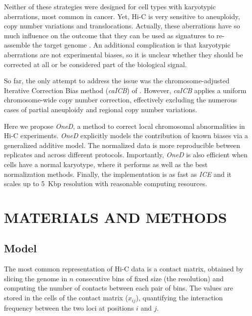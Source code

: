 \documentclass[a4,center,fleqn]{NAR}
\begin{document}
Neither of these strategies were designed for cell types with karyotypic
aberrations, most common in cancer. Yet, Hi-C is very sensitive to
aneuploidy, copy number variations and translocations. Actually, these
aberrations have so much influence on the outcome that they can be used as
signatures to re-assemble the target genome \citep{korbel2013genome}. An
additional complication is that karyotypic aberrations are not
experimental biases, so it is unclear whether they should be corrected at
all or be considered part of the biological signal.

\enlargethispage{-65.1pt}

So far, the only attempt to address the issue was the chromosome-adjusted
Iterative Correction Bias method (\textit{caICB}) of
\cite{wu2016computational}. However, \textit{caICB} applies a uniform
chromosome-wide copy number correction, effectively excluding the numerous
cases of partial aneuploidy and regional copy number variations.

Here we propose \textit{OneD}, a method to correct local chromosomal
abnormalities in Hi-C experiments. \textit{OneD} explicitly models the
contribution of known biases via a generalized additive model. The
normalized data is more reproducible between replicates and across
different protocols. Importantly, \textit{OneD} is also efficient when
cells have a normal karyotype, where it performs as well as the best
normalization methods. Finally, the implementation is as fast as
\textit{ICE} and it scales up to 5~Kbp resolution with reasonable
computing resources.


\section{MATERIALS AND METHODS}

\subsection{Model}

The most common representation of Hi-C data is a contact matrix, obtained
by slicing the genome in $n$ consecutive bins of fixed size (the
resolution) and computing the number of contacts between each pair of
bins. The values are stored in the cells of the contact matrix ($x_{ij}$),
quantifying the interaction frequency between the two loci at positions
$i$ and $j$.
\end{document}
